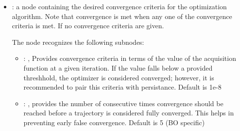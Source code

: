 \begin{itemize}
    \item {}:
      a node containing the desired convergence criteria for the optimization algorithm.
      Note that convergence is met when any one of the convergence criteria is met. If no
      convergence                                            criteria are given.

      The  node recognizes the following subnodes:
      \begin{itemize}
        \item {}: ,
          Provides convergence criteria in terms of the value of the acquisition
          function at a given iteration. If the value falls below a provided threshhold,
          the optimizer is considered converged; however, it is recommended to pair this
          criteria with persistance. Default is 1e-8

        \item {}: ,
          provides the number of consecutive times convergence should
          be reached before a trajectory is considered fully converged.
          This helps in preventing early false convergence. Default is 5 (BO specific)
      \end{itemize}


\end{itemize}
